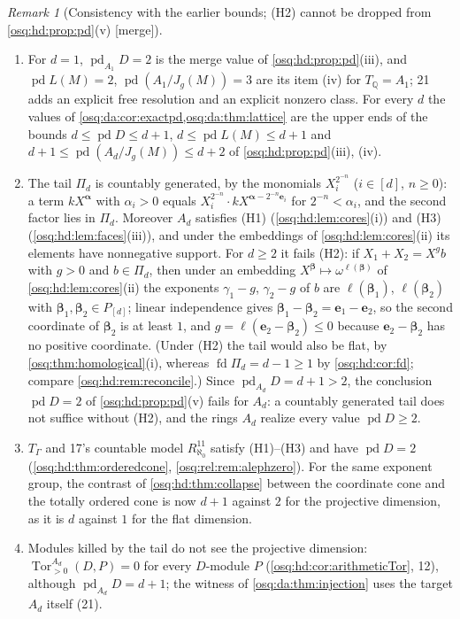 \documentclass[11pt,letterpaper]{article}
\numberwithin{equation}{section}
\theoremstyle{definition}
\theoremstyle{remark}
\newtheorem{remark}[remark]{Remark}
\theoremstyle{plain}
\newcommand{\Q}{\mathbb Q}
\newcommand{\Tor}{\operatorname{Tor}}
\newcommand{\pd}{\operatorname{pd}}
\newcommand{\fd}{\operatorname{fd}}
\newcommand{\merge}{\textup{\textsf{[merge]}}}
\begin{document}
\begin{remark}[Consistency with the earlier bounds; (H2) cannot be dropped from \cref{osq:hd:prop:pd}(v) \merge]\label{osq:da:rem:htwo}
\leavevmode
\begin{enumerate}
\item For $d=1$, $\pd_{A_1}D=2$ is the merge value of \cref{osq:hd:prop:pd}(iii), and $\pd L(M)=2$, $\pd(A_1/J_g(M))=3$ are its item (iv)
for $T_\Q=A_1$; 21 adds an explicit free resolution and an explicit nonzero class. For every $d$ the values of
\cref{osq:da:cor:exactpd,osq:da:thm:lattice} are the upper ends of the bounds $d\le\pd D\le d+1$, $d\le\pd L(M)\le d+1$ and
$d+1\le\pd(A_d/J_g(M))\le d+2$ of \cref{osq:hd:prop:pd}(iii), (iv).
\item The tail $\Pi_d$ is countably generated, by the monomials $X_i^{2^{-n}}$ ($i\in[d]$, $n\ge0$): a term $kX^{\boldsymbol\alpha}$ with
$\alpha_i>0$ equals $X_i^{2^{-n}}\cdot kX^{\boldsymbol\alpha-2^{-n}\mathbf e_i}$ for $2^{-n}<\alpha_i$, and the second factor lies in $\Pi_d$.
Moreover $A_d$ satisfies (H1) (\cref{osq:hd:lem:cores}(i)) and (H3) (\cref{osq:hd:lem:faces}(iii)), and under the embeddings of
\cref{osq:hd:lem:cores}(ii) its elements have nonnegative support. For $d\ge2$ it fails (H2): if $X_1+X_2=X^gb$ with $g>0$ and $b\in\Pi_d$, then under an embedding
$X^{\boldsymbol\beta}\mapsto\omega^{\ell(\boldsymbol\beta)}$ of \cref{osq:hd:lem:cores}(ii) the exponents $\gamma_1-g$, $\gamma_2-g$ of $b$
are $\ell(\boldsymbol\beta_1)$, $\ell(\boldsymbol\beta_2)$ with $\boldsymbol\beta_1,\boldsymbol\beta_2\in P_{[d]}$; linear independence gives
$\boldsymbol\beta_1-\boldsymbol\beta_2=\mathbf e_1-\mathbf e_2$, so the second coordinate of $\boldsymbol\beta_2$ is at least $1$, and
$g=\ell(\mathbf e_2-\boldsymbol\beta_2)\le0$ because $\mathbf e_2-\boldsymbol\beta_2$ has no positive coordinate. (Under (H2) the tail would
also be flat, by \cref{osq:thm:homological}(i), whereas $\fd\Pi_d=d-1\ge1$ by \cref{osq:hd:cor:fd}; compare \cref{osq:hd:rem:reconcile}.)
Since $\pd_{A_d}D=d+1>2$, the conclusion $\pd D=2$ of \cref{osq:hd:prop:pd}(v) fails for $A_d$: a countably
generated tail does not suffice without (H2), and the rings $A_d$ realize every value $\pd D\ge2$.
\item $T_\Gamma$ and 17's countable model $R^{11}_{\aleph_0}$ satisfy (H1)--(H3) and have $\pd D=2$ (\cref{osq:hd:thm:orderedcone},
\cref{osq:rel:rem:alephzero}). For the same exponent group, the contrast of \cref{osq:hd:thm:collapse} between the coordinate cone and the
totally ordered cone is now $d+1$ against $2$ for the projective dimension, as it is $d$ against $1$ for the flat dimension.
\item Modules killed by the tail do not see the projective dimension: $\Tor^{A_d}_{>0}(D,P)=0$ for every $D$-module $P$
(\cref{osq:hd:cor:arithmeticTor}, 12), although $\pd_{A_d}D=d+1$; the witness of \cref{osq:da:thm:injection} uses the target $A_d$ itself
(21).
\end{enumerate}
\end{remark}
\end{document}
